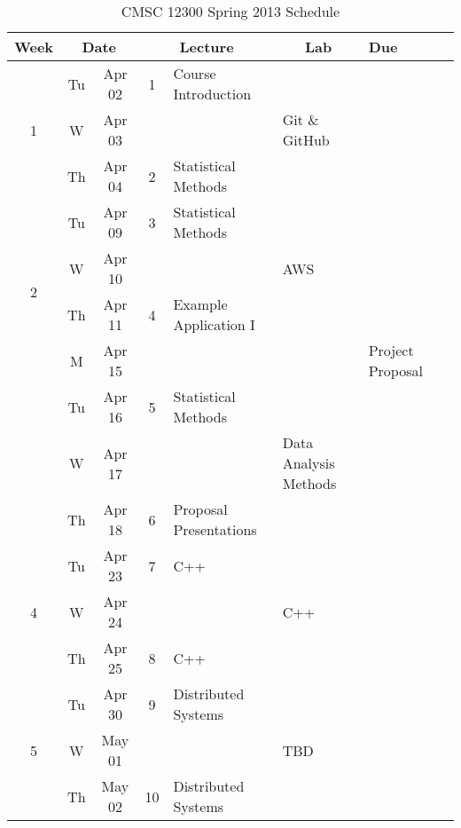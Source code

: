 \documentclass[11pt]{article}
\newcommand{\emptycell}{\cellcolor[gray]{0.9}}
\begin{document}
\begin{landscape}
\sffamily
\setlength{\extrarowheight}{4pt}
\begin{longtable}{|c|cc|c|p{7cm}|p{6cm}|p{2cm}|c|}
\caption{CMSC 12300 Spring 2013 Schedule}\label{tab:calendar}\\
\hline
\textbf{Week} & \multicolumn{2}{c|}{\textbf{Date}} & \multicolumn{ 2}{c|}{\textbf{Lecture}} & \multicolumn{1}{c|}{\textbf{Lab}} & \textbf{Due} \\ \hline
\multirow{3}{*}{1} 	& Tu & Apr 02 	& 1 		& Course Introduction 		& \emptycell  	& \emptycell \\ \cline{ 2- 8}
			& W & Apr 03	& \emptycell 	& \emptycell			& Git \& GitHub	& \emptycell \\ \cline{ 2- 8}
			& Th & Apr 04 	& 2 		& Statistical Methods      	& \emptycell  	& \emptycell \\ \hline\hline

\multirow{4}{*}{2} 	& Tu & Apr 09 	& 3 		& Statistical Methods      	& \emptycell  	& \emptycell \\ \cline{ 2- 8}
			& W & Apr 10	& \emptycell 	& \emptycell			& AWS	 	& \emptycell \\ \cline{ 2- 8}
			& Th & Apr 11 	& 4 		& Example Application I    	& \emptycell  	& \emptycell \\ \hline\hline

\multirow{3}{*}{3} 	& M & Apr 15 	& \emptycell	& \emptycell 			& \emptycell  	& Project \mbox{Proposal} \\ \cline{ 2- 8}			
			& Tu & Apr 16 	& 5 		& Statistical Methods   	& \emptycell  	& \emptycell \\ \cline{ 2- 8}
			& W & Apr 17	& \emptycell 	& \emptycell			& Data Analysis Methods	 	& \emptycell \\ \cline{ 2- 8}
			& Th & Apr 18 	& 6 		& Proposal Presentations	& \emptycell  	& \emptycell \\ \hline\hline

\multirow{3}{*}{4} 	& Tu & Apr 23 	& 7 		& C++				& \emptycell  	& \emptycell \\ \cline{ 2- 8}
			& W & Apr 24	& \emptycell 	& \emptycell			& C++	 	& \emptycell \\ \cline{ 2- 8}
			& Th & Apr 25 	& 8 		& C++			 	& \emptycell  	& \emptycell \\ \hline\hline

\multirow{3}{*}{5} 	& Tu & Apr 30 	& 9 		& Distributed Systems		& \emptycell  	& \emptycell \\ \cline{ 2- 8}
			& W & May 01	& \emptycell 	& \emptycell			& TBD	 	& \emptycell \\ \cline{ 2- 8}
			& Th & May 02 	& 10 		& Distributed Systems	 	& \emptycell  	& \emptycell \\ \hline\hline


\end{longtable}
\end{landscape}
\end{document}
